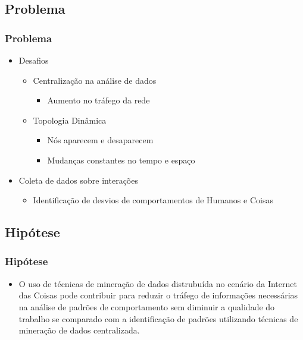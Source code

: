 \documentclass[hyperref={pdfpagelabels=false}]{beamer}
\begin{document}
\subsection{Problema}
 
\begin{frame}

	\frametitle{Problema}	

	\begin{itemize}
    	\item Desafios \cite{000-000} \begin{itemize}
        	\item Centralização na análise de dados \begin{itemize}
      	    	\item Aumento no tráfego da rede
			\end{itemize}
       		\item Topologia Dinâmica \begin{itemize}
          		\item Nós aparecem e desaparecem
               	\item Mudanças constantes no tempo e espaço
			\end{itemize}
        \end{itemize}
        \item Coleta de dados sobre interações \begin{itemize}
        	\item Identificação de desvios de comportamentos de Humanos e Coisas
        	\end{itemize}
	\end{itemize}
    
\end{frame}
 
\subsection{Hipótese}
 
\begin{frame}
	\frametitle{Hipótese}
	
    \begin{itemize}
    	\item O uso de t\'{e}cnicas de minera\c{c}\~{a}o de dados distrubu\'{i}da no cenário da Internet das Coisas pode contribuir para reduzir o tráfego de informações necessárias na análise de padrões de comportamento sem diminuir a qualidade do trabalho se comparado com a identificação de padrões utilizando técnicas de mineração de dados centralizada.
    \end{itemize}
\end{frame}
\end{document}
